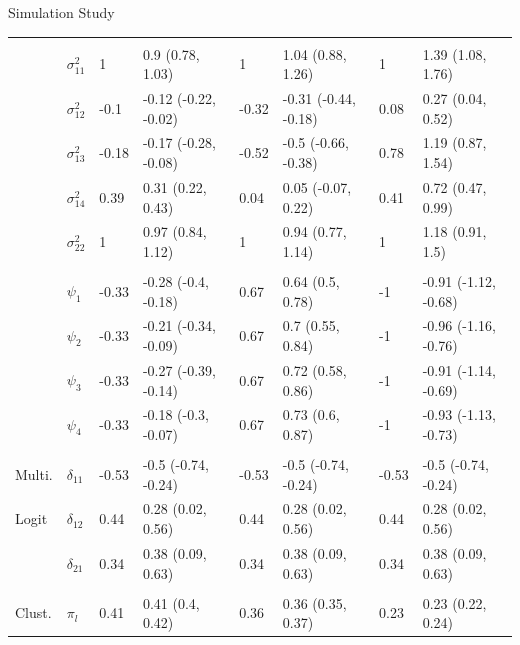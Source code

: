 \documentclass[final]{beamer}
\newlength{\onecolwid}
\newlength{\twocolwid}
\begin{document}
\begin{frame}[t]
\begin{columns}[t]
\begin{column}{\twocolwid}
\begin{columns}[t,totalwidth=\twocolwid]
\begin{column}{\onecolwid}
\begin{block}{Simulation Study}
\begin{table}[t]
\begin{tabular}{llllllll}
\addlinespace[0.3em]
\multicolumn{8}{l}{\textbf{ }}\\
\hspace{1em} & $\sigma^2_{11}$ & 1 & 0.9 (0.78, 1.03) & 1 & 1.04 (0.88, 1.26) & 1 & 1.39 (1.08, 1.76)\\
\hspace{1em} & $\sigma^2_{12}$ & -0.1 & -0.12 (-0.22, -0.02) & -0.32 & -0.31 (-0.44, -0.18) & 0.08 & 0.27 (0.04, 0.52)\\
\hspace{1em} & $\sigma^2_{13}$ & -0.18 & -0.17 (-0.28, -0.08) & -0.52 & -0.5 (-0.66, -0.38) & 0.78 & 1.19 (0.87, 1.54)\\
\hspace{1em} & $\sigma^2_{14}$ & 0.39 & 0.31 (0.22, 0.43) & 0.04 & 0.05 (-0.07, 0.22) & 0.41 & 0.72 (0.47, 0.99)\\
\hspace{1em} & $\sigma^2_{22}$ & 1 & 0.97 (0.84, 1.12) & 1 & 0.94 (0.77, 1.14) & 1 & 1.18 (0.91, 1.5)\\

\addlinespace[0.3em]
\multicolumn{8}{l}{\textbf{ }}\\
\hspace{1em} & $\psi_{1}$ & -0.33 & -0.28 (-0.4, -0.18) & 0.67 & 0.64 (0.5, 0.78) & -1 & -0.91 (-1.12, -0.68)\\
\hspace{1em} & $\psi_{2}$ & -0.33 & -0.21 (-0.34, -0.09) & 0.67 & 0.7 (0.55, 0.84) & -1 & -0.96 (-1.16, -0.76)\\
\hspace{1em} & $\psi_{3}$ & -0.33 & -0.27 (-0.39, -0.14) & 0.67 & 0.72 (0.58, 0.86) & -1 & -0.91 (-1.14, -0.69)\\
\hspace{1em} & $\psi_{4}$ & -0.33 & -0.18 (-0.3, -0.07) & 0.67 & 0.73 (0.6, 0.87) & -1 & -0.93 (-1.13, -0.73)\\
\addlinespace[0.3em]
\multicolumn{8}{l}{\textbf{ }}\\
\hspace{1em}Multi. & $\delta_{11}$ & -0.53 & -0.5 (-0.74, -0.24) & -0.53 & -0.5 (-0.74, -0.24) & -0.53 & -0.5 (-0.74, -0.24)\\
\hspace{1em}Logit & $\delta_{12}$ & 0.44 & 0.28 (0.02, 0.56) & 0.44 & 0.28 (0.02, 0.56) & 0.44 & 0.28 (0.02, 0.56)\\
\hspace{1em} & $\delta_{21}$ & 0.34 & 0.38 (0.09, 0.63) & 0.34 & 0.38 (0.09, 0.63) & 0.34 & 0.38 (0.09, 0.63)\\
\addlinespace[0.3em]
\multicolumn{8}{l}{\textbf{ }}\\
\hspace{1em}Clust. & $\pi_l$ & 0.41 & 0.41 (0.4, 0.42) & 0.36 & 0.36 (0.35, 0.37) & 0.23 & 0.23 (0.22, 0.24)\\
\bottomrule
\end{tabular}
\end{table}


\end{block}
\end{column}
\end{columns}
\end{column}
\end{columns}
\end{frame}
\end{document}
